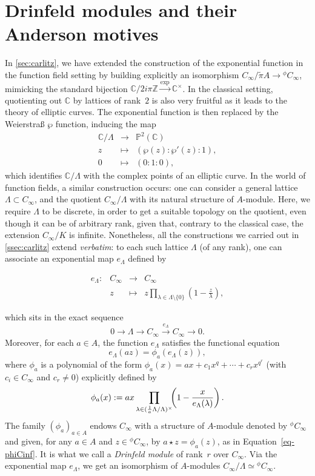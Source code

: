 \documentclass[11pt]{article}
\theoremstyle{definition}
\newcommand{\Function}[5]{
  \[
    \begin{array}{rrcl}
    #1: & #2 & \to     & #3 \\
        & #4 & \mapsto & #5
    \end{array}
  \]
}
\renewcommand{\tilde}{\widetilde}
\newcommand\C{\mathbb{C}}
\newcommand\Z{\mathbb{Z}}
\newcommand{\Cinf}{C_{\infty}}
\newcommand{\phiact}[1]{{}^\phi\! #1}
\begin{document}
\section{Drinfeld modules and their Anderson motives}

\label{sec:drinfeld}

In \cref{sec:carlitz}, we have extended the construction of  the exponential function in the function field setting by building
explicitly an isomorphism $\Cinf / \tilde\pi A \to \phiact{\Cinf}$,
mimicking the standard bijection 
$\C / 2i\pi \Z \stackrel\exp\longrightarrow \C^\times$.
In the classical setting, quotienting out $\C$ by lattices of
rank~$2$ is also very fruitful as it leads to the theory of
elliptic curves. The exponential function is then replaced by the
Weierstraß $\wp$ function, inducing the map
\[\begin{array}{rcl}
    \C/\Lambda & \to  & \mathbb P^2(\C)\\
     z & \mapsto & (\wp(z):\wp'(z):1),\\
     0 & \mapsto & (0:1:0),
\end{array}\]
which identifies $\C/\Lambda$ with the complex points of an elliptic curve.
In the world of function fields, a similar construction occurs: one can consider a general lattice $\Lambda \subset \Cinf$, and the quotient $\Cinf/\Lambda$ with its natural structure of
$A$-module. Here, we require $\Lambda$ to be discrete, in order
to get a suitable topology on the quotient, even though it can be of arbitrary rank, given that, contrary to the classical case, 
the extension $\Cinf/K$ is infinite.
Nonetheless, all the constructions we carried out in 
\cref{ssec:carlitz} extend \emph{verbatim}: to each such
lattice $\Lambda$ (of any rank), one can associate an exponential map $e_\Lambda$
defined by
\Function
  {e_\Lambda}
  {\Cinf}
  {\Cinf}
  {z}
  {\displaystyle z \prod_{\lambda \in \Lambda \setminus\{0\}}
  \left(1-\frac{z}{\lambda}\right),}
which sits in the exact sequence
$$0 \longrightarrow \Lambda \longrightarrow \Cinf 
\overset{e_\Lambda}{\longrightarrow} \Cinf \longrightarrow 0.$$
Moreover, for each $a \in A$, the function $e_\Lambda$ satisfies 
the functional equation 
$$e_\Lambda(az) = \phi_a(e_\Lambda(z)),$$
where $\phi_a$ is a polynomial of the form
$\phi_a(x) = a x + c_1 x^q + \cdots + c_r x^{q^r}$ (with $c_i \in
\Cinf$ and $c_r\neq 0$) explicitly defined by
\begin{equation}
\label{eq:phia}
\phi_a(x) := a x 
  \prod_{\lambda \in (\frac 1 a  \Lambda / \Lambda)^\times} 
    \hspace{-1ex} \left(1 - \frac x {e_\Lambda(\lambda)}\right).
\end{equation}
The family $(\phi_a)_{a\in A}$ endows $\Cinf$ with a structure of $A$-module denoted by $\phiact{\Cinf}$ and given, for any $a\in A$ and $z\in\phiact{\Cinf}$, by $a \star z = \phi_{a}(z)$, as in Equation~\eqref{eq-phiCinf}. It is what we call a
\emph{Drinfeld module} of rank~$r$ over $\Cinf$. Via the exponential map $e_{\Lambda}$, we get an isomorphism of $A$-modules $\Cinf/\Lambda \simeq {}^\phi \Cinf$.
\end{document}
